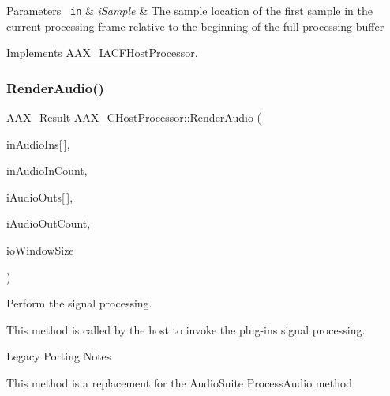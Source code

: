 \begin{DoxyParams}[1]{Parameters}
\mbox{\texttt{ in}}  & {\em i\+Sample} & The sample location of the first sample in the current processing frame relative to the beginning of the full processing buffer \\
\hline
\end{DoxyParams}


Implements \mbox{\hyperlink{a01693_ae9bd1a23f31701d3de6d9d410c819c81}{A\+A\+X\+\_\+\+I\+A\+C\+F\+Host\+Processor}}.

\mbox{\label{a01485_a66e6a701d8dd7d69accde128cb98b342}} 
\subsubsection{\texorpdfstring{RenderAudio()}{RenderAudio()}}
{\footnotesize\ttfamily \mbox{\hyperlink{a00392_a4d8f69a697df7f70c3a8e9b8ee130d2f}{A\+A\+X\+\_\+\+Result}} A\+A\+X\+\_\+\+C\+Host\+Processor\+::\+Render\+Audio (\begin{DoxyParamCaption}\item[{const float $\ast$const}]{in\+Audio\+Ins\mbox{[}$\,$\mbox{]},  }\item[{int32\+\_\+t}]{in\+Audio\+In\+Count,  }\item[{float $\ast$const}]{i\+Audio\+Outs\mbox{[}$\,$\mbox{]},  }\item[{int32\+\_\+t}]{i\+Audio\+Out\+Count,  }\item[{int32\+\_\+t $\ast$}]{io\+Window\+Size }\end{DoxyParamCaption})\hspace{0.3cm}{\ttfamily [virtual]}}



Perform the signal processing. 

This method is called by the host to invoke the plug-\/in\textquotesingle{}s signal processing.

\begin{DoxyRefDesc}{Legacy Porting Notes}
\item[\mbox{\hyperlink{a00787__porting_notes000008}{Legacy Porting Notes}}]This method is a replacement for the Audio\+Suite {\ttfamily Process\+Audio} method\end{DoxyRefDesc}



